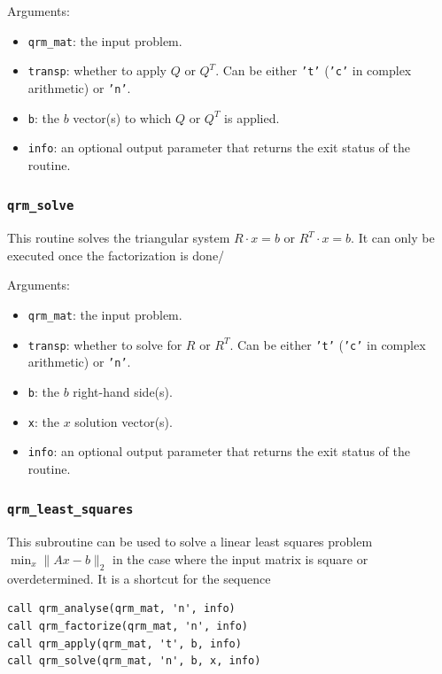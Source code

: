 \documentclass[11pt]{article}
\begin{document}

\noindent Arguments:
\begin{itemize}
\item \texttt{qrm\_mat}: the input problem.
\item \texttt{transp}: whether to apply $Q$ or $Q^T$. Can be either
  \texttt{'t'} (\texttt{'c'} in complex arithmetic) or
  \texttt{'n'}.
\item \texttt{b}: the $b$ vector(s) to which $Q$ or $Q^T$ is
  applied. 
\item \texttt{info}: an optional output parameter that returns the
  exit status of the routine.
\end{itemize}


\subsubsection{\texttt{qrm\_solve}}
This routine solves the triangular system $R\cdot x = b$ or $R^T\cdot
x =b$. It can only be executed once the factorization is done/


\noindent Arguments:
\begin{itemize}
\item \texttt{qrm\_mat}: the input problem.
\item \texttt{transp}: whether to solve for $R$ or $R^T$. Can be either
  \texttt{'t'} (\texttt{'c'} in complex
  arithmetic) or \texttt{'n'}.
\item \texttt{b}: the $b$ right-hand side(s).
\item \texttt{x}: the $x$ solution vector(s).
\item \texttt{info}: an optional output parameter that returns the
  exit status of the routine.
\end{itemize}


\subsubsection{\texttt{qrm\_least\_squares}}
This subroutine can be used to solve a linear least squares problem
$\min_x\|Ax-b\|_2$ in the case where the input matrix is square or
overdetermined. It is a shortcut for the sequence
\begin{lstlisting}
call qrm_analyse(qrm_mat, 'n', info)  
call qrm_factorize(qrm_mat, 'n', info)  
call qrm_apply(qrm_mat, 't', b, info)  
call qrm_solve(qrm_mat, 'n', b, x, info)  
\end{lstlisting}
%
\end{document}
